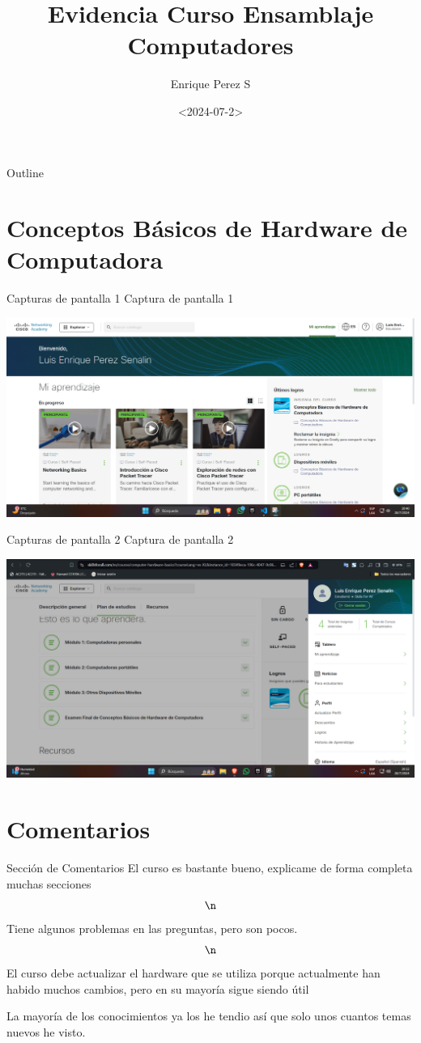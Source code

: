 \documentclass[presentation]{beamer}
\author{Enrique Perez S}
\date{<2024-07-2>}
\title{Evidencia Curso Ensamblaje Computadores}
\begin{document}
\maketitle
\begin{frame}{Outline}
\tableofcontents
\end{frame}


\section{Conceptos Básicos de Hardware de Computadora}
\label{sec:org5f70ec6}
\begin{frame}[label={sec:orga55e1a3}]{Capturas de pantalla 1}
Captura de pantalla 1
\begin{center}
\includegraphics[width=.9\linewidth]{./dashboard.png}
\end{center}
\end{frame}
\begin{frame}[label={sec:orgbcb7a69}]{Capturas de pantalla 2}
Captura de pantalla 2
\begin{center}
\includegraphics[width=.9\linewidth]{./todas_secciones.png}
\end{center}
\end{frame}

\section{Comentarios}
\label{sec:orgbd085da}
\begin{frame}[label={sec:org31b0eda}]{Sección de Comentarios}
El curso es bastante bueno, explicame de forma completa muchas secciones $$\n$$
Tiene algunos problemas en las preguntas, pero son pocos. $$\n$$
El curso debe actualizar el hardware que se utiliza porque actualmente han habido muchos cambios, pero en su mayoría sigue siendo útil

La mayoría de los conocimientos ya los he tendio así que solo unos cuantos temas nuevos he visto.
\end{frame}
\end{document}
